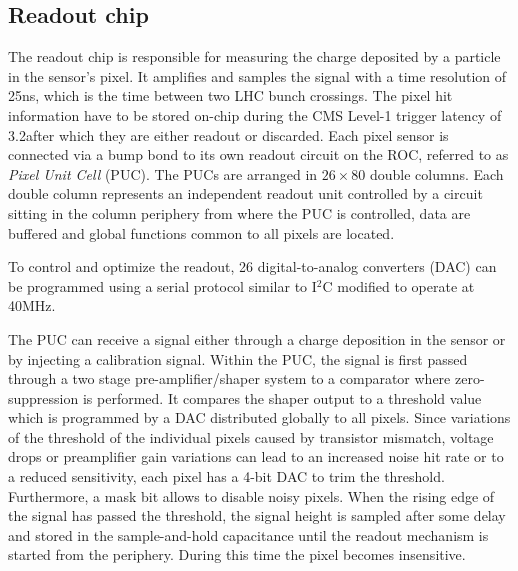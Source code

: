 \subsection{Readout chip}\label{subsec:BPix_ROC}

The readout chip is responsible for measuring the charge deposited by a particle in the sensor's pixel.
It amplifies and samples the signal with a time resolution of 25\unit{ns}, which is the time between two LHC bunch crossings.
The pixel hit information have to be stored on-chip during the CMS Level-1 trigger latency of 3.2\mus after which they are either readout or discarded.
Each pixel sensor is connected via a bump bond to its own readout circuit on the ROC, referred to as {\it Pixel Unit Cell} (PUC). 
The PUCs are arranged in $26\times80$ double columns. Each double column represents an independent readout unit controlled by a circuit sitting in the column periphery from where the PUC is controlled, data are buffered and global functions common to all pixels are located.

To control and optimize the readout, 26 digital-to-analog converters (DAC) can be programmed using a serial protocol similar to I$^2$C modified to operate at 40\unit{MHz}.

The PUC can receive a signal either through a charge deposition in the sensor or by injecting a calibration signal.
Within the PUC, the signal is first passed through a two stage pre-amplifier/shaper system to a comparator where zero-suppression is performed.
It compares the shaper output to a threshold value which is programmed by a DAC distributed globally to all pixels.
Since variations of the threshold of the individual pixels caused by transistor mismatch, voltage drops or preamplifier gain variations can lead to an increased noise hit rate or to a reduced sensitivity, each pixel has a 4-bit DAC to trim the threshold. Furthermore, a mask bit allows to disable noisy pixels.
When the rising edge of the signal has passed the threshold, the signal height is sampled after some delay and stored in the sample-and-hold capacitance until the readout mechanism is started from the periphery. During this time the pixel becomes insensitive.

